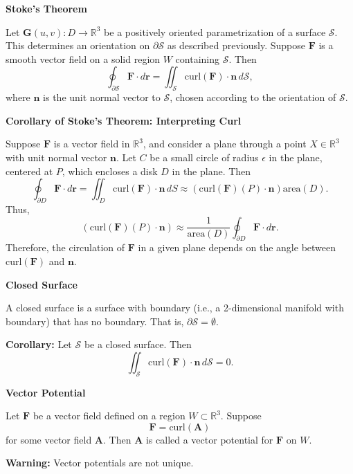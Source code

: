 \documentclass{article}
\newcommand{\R}{\mathbb{R}}
\newenvironment{definition}[1]{
    \par\noindent\textbf{#1}\par\noindent
}{
    \par \vspace{0.5cm}
}
\begin{document}
\begin{definition}{Stoke's Theorem}
Let \(\bm{G}(u, v) : D \rightarrow \R^3\) be a positively oriented parametrization of a surface \(\mathcal{S}\). This determines an orientation on \(\partial \mathcal{S}\) as described previously. Suppose \(\bm{F}\) is a smooth vector field on a solid region \(W\) containing \(\mathcal{S}\). Then
\[ \oint_{\partial \mathcal{S}} \bm{F} \cdot d\bm{r} = \iint_{\mathcal{S}} \text{curl}(\bm{F}) \cdot \bm{n} \, d\mathcal{S}, \]
where \(\bm{n}\) is the unit normal vector to \(\mathcal{S}\), chosen according to the orientation of \(\mathcal{S}\).
\end{definition}


\begin{definition}{Corollary of Stoke's Theorem: Interpreting Curl}
Suppose \(\bm{F}\) is a vector field in \(\R^3\), and consider a plane through a point \(X \in \R^3\) with unit normal vector \(\bm{n}\). Let \(C\) be a small circle of radius \(\epsilon\) in the plane, centered at \(P\), which encloses a disk \(D\) in the plane. Then
\[ \oint_{\partial D} \bm{F} \cdot d\bm{r} = \iint_{D} \text{curl}(\bm{F}) \cdot \bm{n} \, dS \approx (\text{curl}(\bm{F})(P) \cdot \bm{n})\text{area}(D). \]
Thus,
\[ (\text{curl}(\bm{F})(P) \cdot \bm{n}) \approx \frac{1}{\text{area}(D)} \oint_{\partial D} \bm{F} \cdot d\bm{r}. \]
Therefore, the circulation of \(\bm{F}\) in a given plane depends on the angle between \(\text{curl}(\bm{F})\) and \(\bm{n}\).
\end{definition}


\begin{definition}{Closed Surface}
A closed surface is a surface with boundary (i.e., a 2-dimensional manifold with boundary) that has no boundary. That is, \(\partial \mathcal{S} = \emptyset\).

\textbf{Corollary:} Let \(\mathcal{S}\) be a closed surface. Then
\[ \iint_{\mathcal{S}} \text{curl}(\bm{F}) \cdot \bm{n} \, d\mathcal{S} = 0. \]
\end{definition}


\begin{definition}{Vector Potential}
Let \(\bm{F}\) be a vector field defined on a region \(W \subset \R^3\). Suppose
\[ \bm{F} = \text{curl}(\bm{A}) \]
for some vector field \(\bm{A}\). Then \(\bm{A}\) is called a vector potential for \(\bm{F}\) on \(W\).

\textbf{Warning:} Vector potentials are not unique.
\end{definition}
\end{document}
